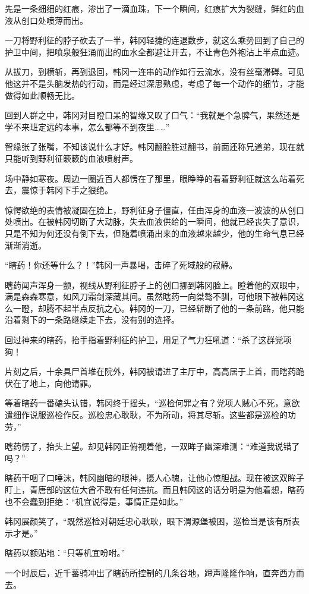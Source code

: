 先是一条细细的红痕，渗出了一滴血珠，下一个瞬间，红痕扩大为裂缝，鲜红的血液从创口处喷薄而出。

一刀将野利征的脖子砍去了一半，韩冈轻捷的连退数步，就这么乘势回到了自己的护卫中间，把喷泉般狂涌而出的血水全都避让开去，不让青色外袍沾上半点血迹。

从拔刀，到横斩，再到退回，韩冈一连串的动作如行云流水，没有丝毫滞碍。可见他这并不是头脑发热的行动，而是经过深思熟虑，考虑了每一个动作的细节，才能做得如此顺畅无比。

回到人群之中，韩冈对目瞪口呆的智缘又叹了口气：“我就是个急脾气，果然还是学不来班定远的本事，怎么都等不到夜里……”

智缘张了张嘴，不知该说什么才好。韩冈翻脸胜过翻书，前面还称兄道弟，现在就只能听到野利征簌簌的血液喷射声。

场中静如寒夜。周边一圈近百人都愣在了那里，眼睁睁的看着野利征就这么站着死去，震惊于韩冈下手之狠绝。

惊愕欲绝的表情被凝固在脸上，野利征身子僵直，任由浑身的血液一波波的从创口处喷出。在被韩冈切断了大动脉，失去血液供给的一瞬间，他就已经丧失了意识，只是不知为何还没有倒下去，但随着喷涌出来的血液越来越少，他的生命气息已经渐渐消逝。

“瞎药！你还等什么？！”韩冈一声暴喝，击碎了死域般的寂静。

瞎药闻声浑身一颤，视线从野利征脖子上的创口挪到韩冈脸上。瞪着他的双眼中，满是森森寒意，如风刀霜剑深藏其间。虽然瞎药一向桀骜不驯，可他眼下被韩冈这么一瞪，却腾不起半点反抗之心。韩冈的一刀，已经斩断了他的一条前路，他只能沿着剩下的一条路继续走下去，没有别的选择。

回过神来的瞎药，抬手指着野利征的护卫，用足了气力狂吼道：“杀了这群党项狗！

片刻之后，十余具尸首堆在院外，韩冈被请进了主厅中，高高居于上首，而瞎药跪伏在了地上，向他请罪。

等着瞎药一番磕头认错，韩冈终于摇头，“巡检何罪之有？党项人贼心不死，意欲遣细作说服巡检作反。巡检忠心耿耿，不为所动，将其尽斩。这些都是巡检的功劳，”

瞎药愣了，抬头上望。却见韩冈正俯视着他，一双眸子幽深难测：“难道我说错了吗？”

瞎药干咽了口唾沫，韩冈幽暗的眼神，摄人心魄，让他心惊胆战。现在被这双眸子盯上，青唐部的这位大酋不敢有任何违抗。而且韩冈这的话分明是为他着想，瞎药也不会蠢到拒绝：“机宜说得是，事情正是如此。”

韩冈展颜笑了，“既然巡检对朝廷忠心耿耿，眼下渭源堡被困，巡检当是该有所表示才是。”

瞎药以额贴地：“只等机宜吩咐。”

一个时辰后，近千蕃骑冲出了瞎药所控制的几条谷地，蹄声隆隆作响，直奔西方而去。

